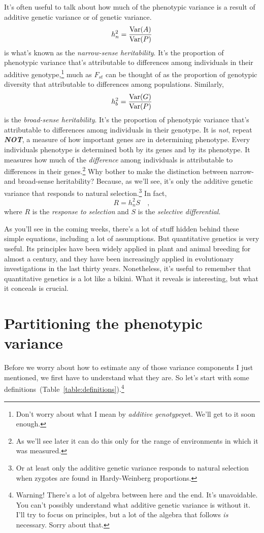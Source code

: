 It's often useful to talk about how much of the phenotypic variance is
a result of additive genetic variance or of genetic variance.
\[
h^2_n = \frac{\mbox{Var}(A)}{\mbox{Var}(P)}
\]
is what's known as the {\it narrow-sense heritability}. It's the
proportion of phenotypic variance that's attributable to differences
among individuals in their additive genotype,\footnote{Don't worry
  about what I mean by {\it additive genotype}{\dash}yet. We'll get to
  it soon enough.} much as $F_{st}$ can be thought of as the
proportion of genotypic diversity that attributable to differences
among populations. Similarly,
\[
h^2_b = \frac{\mbox{Var}(G)}{\mbox{Var}(P)}
\]
is the {\it broad-sense heritability}. It's the proportion of
phenotypic variance that's attributable to differences among
individuals in their genotype. It is {\it not}, repeat {\bf\it NOT}, a
measure of how important genes are in determining phenotype. Every
individuals phenotype is determined both by its genes and by its
phenotype. It measures how much of the {\it difference\/} among
individuals is attributable to differences in their genes.\footnote{As
  we'll see later it can do this only for the range of environments in
  which it was measured.} Why bother
to make the distinction between narrow- and broad-sense heritability?
Because, as we'll see, it's only the additive genetic variance that
responds to natural selection.\footnote{Or at least only the additive
  genetic variance responds to natural selection when zygotes are
  found in Hardy-Weinberg proportions.} In fact,
\[
R = h^2_nS \quad ,
\]
where $R$ is the {\it response to selection\/} and $S$ is the
{\it selective differential}.

As you'll see in the coming weeks, there's a lot of stuff hidden
behind these simple equations, including a lot of assumptions. But
quantitative genetics is very useful. Its principles have been widely
applied in plant and animal breeding for almost a century, and they
have been increasingly applied in evolutionary investigations in the
last thirty years. Nonetheless, it's useful to remember that
quantitative genetics is a lot like a bikini. What it reveals is
interesting, but what it conceals is crucial.

\section*{Partitioning the phenotypic variance}

Before we worry about how to estimate any of those variance components
I just mentioned, we first have to understand what they are. So let's
start with some
definitions~(Table~\ref{table:definitions}).\footnote{Warning! There's
  a lot of algebra between here and the end. It's unavoidable. You
  can't possibly understand what additive genetic variance is without
  it. I'll try to focus on principles, but a lot of the algebra that
  follows {\it is\/} necessary. Sorry about that.}

